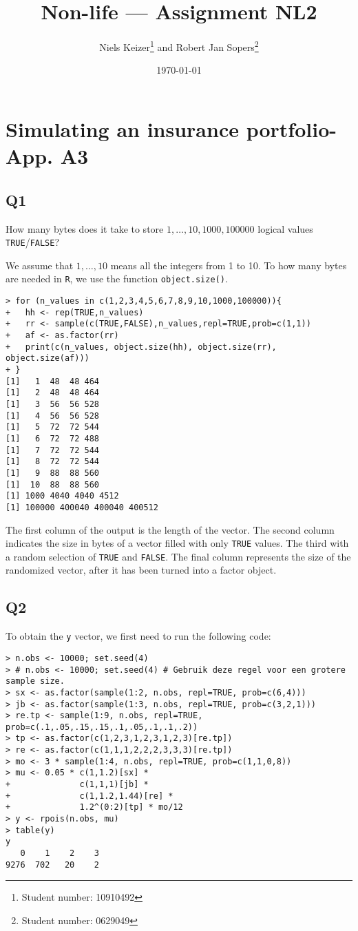 \documentclass[11pt]{article}
\title{Non-life --- Assignment NL2}  %
\author{
  Niels Keizer\footnote{Student number: 10910492}
  \quad and \quad
  Robert Jan Sopers\footnote{Student number: 0629049}
}
\date{\today}
\begin{document}
\maketitle

\section{Simulating an insurance portfolio-App. A3}

\subsection*{Q1}

How many bytes does it take to store $1,\ldots, 10, 1000, 100000$ logical values \verb|TRUE|/\verb|FALSE|?

We assume that $1,\ldots, 10$ means all the integers from 1 to 10. To how many bytes are needed in \verb|R|, we use the function \verb|object.size()|.

\begin{verbatim}
> for (n_values in c(1,2,3,4,5,6,7,8,9,10,1000,100000)){
+   hh <- rep(TRUE,n_values)
+   rr <- sample(c(TRUE,FALSE),n_values,repl=TRUE,prob=c(1,1))
+   af <- as.factor(rr)
+   print(c(n_values, object.size(hh), object.size(rr), object.size(af)))
+ }
[1]   1  48  48 464
[1]   2  48  48 464
[1]   3  56  56 528
[1]   4  56  56 528
[1]   5  72  72 544
[1]   6  72  72 488
[1]   7  72  72 544
[1]   8  72  72 544
[1]   9  88  88 560
[1]  10  88  88 560
[1] 1000 4040 4040 4512
[1] 100000 400040 400040 400512
\end{verbatim}

The first column of the output is the length of the vector. The second column indicates the size in bytes of a vector filled with only \verb|TRUE| values. The third with a random selection of \verb|TRUE| and \verb|FALSE|. The final column represents the size of the randomized vector, after it has been turned into a factor object.

\subsection*{Q2}

To obtain the \verb|y| vector, we first need to run the following code:

\begin{verbatim}
> n.obs <- 10000; set.seed(4)
> # n.obs <- 10000; set.seed(4) # Gebruik deze regel voor een grotere sample size.
> sx <- as.factor(sample(1:2, n.obs, repl=TRUE, prob=c(6,4)))
> jb <- as.factor(sample(1:3, n.obs, repl=TRUE, prob=c(3,2,1)))
> re.tp <- sample(1:9, n.obs, repl=TRUE, prob=c(.1,.05,.15,.15,.1,.05,.1,.1,.2))
> tp <- as.factor(c(1,2,3,1,2,3,1,2,3)[re.tp]) 
> re <- as.factor(c(1,1,1,2,2,2,3,3,3)[re.tp])
> mo <- 3 * sample(1:4, n.obs, repl=TRUE, prob=c(1,1,0,8))
> mu <- 0.05 * c(1,1.2)[sx] *
+              c(1,1,1)[jb] * 
+              c(1,1.2,1.44)[re] * 
+              1.2^(0:2)[tp] * mo/12 
> y <- rpois(n.obs, mu)
> table(y)
y
   0    1    2    3 
9276  702   20    2 
\end{verbatim}
\end{document}
